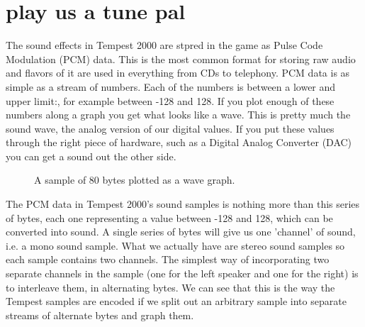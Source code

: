 \chapter{play us a tune pal}
\label{sec:listing}
\lstset{style=68KStyle}

The sound effects in Tempest 2000 are stpred in the game as Pulse Code Modulation (PCM) data. This is the most common format for storing
raw audio and flavors of it are used in everything from CDs to telephony. PCM data is as simple as a stream of numbers. Each of the numbers
is between a lower and upper limit:, for example between -128 and 128. If you plot enough of these numbers along a graph you get what looks like
a wave. This is pretty much the sound wave, the analog version of our digital values. If you put these values through the right piece of hardware,
such as a Digital Analog Converter (DAC) you can get a sound out the other side.

\begin{figure}[H]
    \centering
    \begin{adjustbox}{width=7cm,center}
    \end{adjustbox}
  \caption{A sample of 80 bytes plotted as a wave graph.}
\end{figure}

The PCM data in Tempest 2000's sound samples is nothing more than this series of bytes, each one representing a value between -128 and 128, which can
be converted into sound. A single series of bytes will give us one 'channel' of sound, i.e. a mono sound sample. What we actually have are stereo
sound samples so each sample contains two channels. The simplest way of incorporating two separate channels in the sample (one for the left speaker
and one for the right) is to interleave them, in alternating bytes. We can see that this is the way the Tempest samples are encoded if we split out
an arbitrary sample into separate streams of alternate bytes and graph them.

